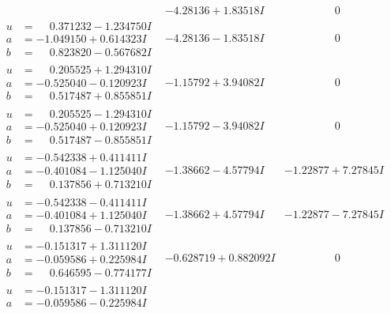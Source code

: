 \documentclass[1p]{elsarticle_modified}
\theoremstyle{definition}
\begin{document}
$$\begin{array}{c|c|c}
 & -4.28136 + 1.83518 I & \phantom{-0.000000 } 0 \\ \hline\begin{aligned}
u &= \phantom{-}0.371232 - 1.234750 I \\
a &= -1.049150 + 0.614323 I \\
b &= \phantom{-}0.823820 - 0.567682 I\end{aligned}
 & -4.28136 - 1.83518 I & \phantom{-0.000000 } 0 \\ \hline\begin{aligned}
u &= \phantom{-}0.205525 + 1.294310 I \\
a &= -0.525040 - 0.120923 I \\
b &= \phantom{-}0.517487 + 0.855851 I\end{aligned}
 & -1.15792 + 3.94082 I & \phantom{-0.000000 } 0 \\ \hline\begin{aligned}
u &= \phantom{-}0.205525 - 1.294310 I \\
a &= -0.525040 + 0.120923 I \\
b &= \phantom{-}0.517487 - 0.855851 I\end{aligned}
 & -1.15792 - 3.94082 I & \phantom{-0.000000 } 0 \\ \hline\begin{aligned}
u &= -0.542338 + 0.411411 I \\
a &= -0.401084 - 1.125040 I \\
b &= \phantom{-}0.137856 + 0.713210 I\end{aligned}
 & -1.38662 - 4.57794 I & -1.22877 + 7.27845 I \\ \hline\begin{aligned}
u &= -0.542338 - 0.411411 I \\
a &= -0.401084 + 1.125040 I \\
b &= \phantom{-}0.137856 - 0.713210 I\end{aligned}
 & -1.38662 + 4.57794 I & -1.22877 - 7.27845 I \\ \hline\begin{aligned}
u &= -0.151317 + 1.311120 I \\
a &= -0.059586 + 0.225984 I \\
b &= \phantom{-}0.646595 - 0.774177 I\end{aligned}
 & -0.628719 + 0.882092 I & \phantom{-0.000000 } 0 \\ \hline\begin{aligned}
u &= -0.151317 - 1.311120 I \\
a &= -0.059586 - 0.225984 I \\

\end{aligned}
\end{array}$$
\end{document}
